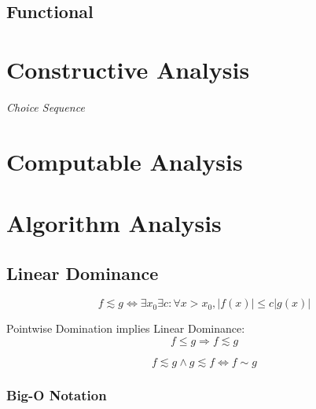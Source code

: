 \subsection{Functional}\label{sec:functional}



\section{Constructive Analysis}\label{sec:constructive_analysis}

\emph{Choice Sequence}

\section{Computable Analysis}\label{sec:computable_analysis}

\section{Algorithm Analysis}\label{sec:algorithm_analysis}

\subsection{Linear Dominance}\label{sec:linear_dominance}

\[
    f \lesssim g \Leftrightarrow
    \exists x_0 \exists c : \forall x > x_0, |f(x)| \leq c |g(x)|
\]

Pointwise Domination implies Linear Dominance:
\[
    f \leq g \Rightarrow f \lesssim g
\]

\[
    f \lesssim g \wedge g \lesssim f \Leftrightarrow f \sim g
\]



\subsubsection{Big-O Notation}\label{sec:bigo_notation}


